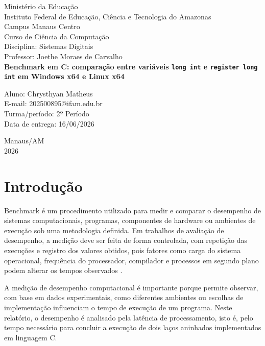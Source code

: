 \documentclass[12pt,oneside,a4paper,brazil]{abntex2}
\begin{document}
\imprimircapa

\begin{folhaderosto}
\begin{center}
{\ABNTEXchapterfont\large Ministério da Educação}\\
{\ABNTEXchapterfont\large Instituto Federal de Educação, Ciência e Tecnologia do Amazonas}\\
{\ABNTEXchapterfont\large Campus Manaus Centro}\\[1.5cm]
{\ABNTEXchapterfont\large Curso de Ciência da Computação}\\
{\ABNTEXchapterfont\large Disciplina: Sistemas Digitais}\\
{\ABNTEXchapterfont\large Professor: Joethe Moraes de Carvalho}\\[2.5cm]
{\ABNTEXchapterfont\bfseries\Large Benchmark em C: comparação entre variáveis \texttt{long int} e \texttt{register long int} em Windows x64 e Linux x64}\\[2.5cm]
\end{center}
\begin{flushright}
Aluno: Chrysthyan Matheus\\
E-mail: 202500895@ifam.edu.br\\
Turma/período: 2º Período\\
Data de entrega: 16/06/2026
\end{flushright}
\vfill
\begin{center}
Manaus/AM\\
2026
\end{center}
\end{folhaderosto}

\textual

\chapter{Introdução}

Benchmark é um procedimento utilizado para medir e comparar o desempenho de sistemas computacionais, programas, componentes de hardware ou ambientes de execução sob uma metodologia definida. Em trabalhos de avaliação de desempenho, a medição deve ser feita de forma controlada, com repetição das execuções e registro dos valores obtidos, pois fatores como carga do sistema operacional, frequência do processador, compilador e processos em segundo plano podem alterar os tempos observados \cite{jain1991art,hennessy2019computer}.

A medição de desempenho computacional é importante porque permite observar, com base em dados experimentais, como diferentes ambientes ou escolhas de implementação influenciam o tempo de execução de um programa. Neste relatório, o desempenho é analisado pela latência de processamento, isto é, pelo tempo necessário para concluir a execução de dois laços aninhados implementados em linguagem C.
\end{document}
